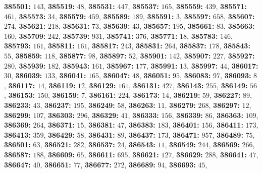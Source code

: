 \textsf{\bfseries 385501:} $143$, \textsf{\bfseries 385519:} $48$, \textsf{\bfseries 385531:} $447$, \textsf{\bfseries 385537:} $165$, \textsf{\bfseries 385559:} $439$, \textsf{\bfseries 385571:} $461$, \textsf{\bfseries 385573:} $34$, \textsf{\bfseries 385579:} $459$, \textsf{\bfseries 385589:} $189$, \textsf{\bfseries 385591:} $3$, \textsf{\bfseries 385597:} $658$, \textsf{\bfseries 385607:} $274$, \textsf{\bfseries 385621:} $218$, \textsf{\bfseries 385631:} $73$, \textsf{\bfseries 385639:} $43$, \textsf{\bfseries 385657:} $195$, \textsf{\bfseries 385661:} $83$, \textsf{\bfseries 385663:} $160$, \textsf{\bfseries 385709:} $242$, \textsf{\bfseries 385739:} $931$, \textsf{\bfseries 385741:} $376$, \textsf{\bfseries 385771:} $18$, \textsf{\bfseries 385783:} $146$, \textsf{\bfseries 385793:} $161$, \textsf{\bfseries 385811:} $161$, \textsf{\bfseries 385817:} $243$, \textsf{\bfseries 385831:} $264$, \textsf{\bfseries 385837:} $178$, \textsf{\bfseries 385843:} $55$, \textsf{\bfseries 385859:} $118$, \textsf{\bfseries 385877:} $98$, \textsf{\bfseries 385897:} $52$, \textsf{\bfseries 385901:} $142$, \textsf{\bfseries 385907:} $227$, \textsf{\bfseries 385927:} $280$, \textsf{\bfseries 385939:} $182$, \textsf{\bfseries 385943:} $161$, \textsf{\bfseries 385967:} $177$, \textsf{\bfseries 385991:} $13$, \textsf{\bfseries 385997:} $44$, \textsf{\bfseries 386017:} $30$, \textsf{\bfseries 386039:} $133$, \textsf{\bfseries 386041:} $165$, \textsf{\bfseries 386047:} $48$, \textsf{\bfseries 386051:} $95$, \textsf{\bfseries 386083:} $97$, \textsf{\bfseries 386093:} $8$, \textsf{\bfseries 386117:} $14$, \textsf{\bfseries 386119:} $12$, \textsf{\bfseries 386129:} $161$, \textsf{\bfseries 386131:} $427$, \textsf{\bfseries 386143:} $255$, \textsf{\bfseries 386149:} $56$, \textsf{\bfseries 386153:} $150$, \textsf{\bfseries 386159:} $7$, \textsf{\bfseries 386161:} $224$, \textsf{\bfseries 386173:} $14$, \textsf{\bfseries 386219:} $59$, \textsf{\bfseries 386227:} $89$, \textsf{\bfseries 386233:} $43$, \textsf{\bfseries 386237:} $195$, \textsf{\bfseries 386249:} $58$, \textsf{\bfseries 386263:} $11$, \textsf{\bfseries 386279:} $268$, \textsf{\bfseries 386297:} $12$, \textsf{\bfseries 386299:} $107$, \textsf{\bfseries 386303:} $296$, \textsf{\bfseries 386329:} $41$, \textsf{\bfseries 386333:} $156$, \textsf{\bfseries 386339:} $86$, \textsf{\bfseries 386363:} $109$, \textsf{\bfseries 386369:} $264$, \textsf{\bfseries 386371:} $15$, \textsf{\bfseries 386381:} $47$, \textsf{\bfseries 386383:} $183$, \textsf{\bfseries 386401:} $156$, \textsf{\bfseries 386411:} $173$, \textsf{\bfseries 386413:} $359$, \textsf{\bfseries 386429:} $58$, \textsf{\bfseries 386431:} $89$, \textsf{\bfseries 386437:} $173$, \textsf{\bfseries 386471:} $957$, \textsf{\bfseries 386489:} $75$, \textsf{\bfseries 386501:} $63$, \textsf{\bfseries 386521:} $282$, \textsf{\bfseries 386537:} $24$, \textsf{\bfseries 386543:} $11$, \textsf{\bfseries 386549:} $244$, \textsf{\bfseries 386569:} $266$, \textsf{\bfseries 386587:} $188$, \textsf{\bfseries 386609:} $65$, \textsf{\bfseries 386611:} $695$, \textsf{\bfseries 386621:} $127$, \textsf{\bfseries 386629:} $288$, \textsf{\bfseries 386641:} $47$, \textsf{\bfseries 386647:} $40$, \textsf{\bfseries 386651:} $77$, \textsf{\bfseries 386677:} $272$, \textsf{\bfseries 386689:} $94$, \textsf{\bfseries 386693:} $45$, 
